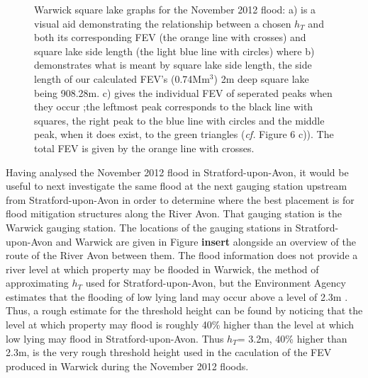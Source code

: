 \documentclass[11pt,a4paper]{article}
\begin{document}
\begin{figure}[ht!]
\centering
{}
\hfill
{}
\caption{Warwick square lake graphs for the November 2012 flood: a) is a visual aid demonstrating the relationship between a chosen $h_T$ and both its corresponding FEV (the orange line with crosses) and square lake side length (the light blue line with circles) where b) demonstrates what is meant by square lake side length, the side length of our calculated FEV's (0.74Mm$^3$) 2m deep square lake being 908.28m. c) gives the individual FEV of seperated peaks when they occur {;}the leftmost peak corresponds to the black line with squares, the right peak to the blue line with circles and the middle peak, when it does exist, to the green triangles (\textit{cf.} Figure 6 c)). The total FEV is given by the orange line with crosses.}
\end{figure}

Having analysed the November 2012 flood in Stratford-upon-Avon, it would be useful to next investigate the same flood at the next gauging station upstream from Stratford-upon-Avon in order to determine where the best placement is for flood mitigation structures along the River Avon. That gauging station is the Warwick gauging station. The locations of the gauging stations in Stratford-upon-Avon and Warwick are given in Figure \textbf{insert} alongside an overview of the route of the River Avon between them. The flood information does not provide a river level at which property may be flooded in Warwick, the method of approximating $h_T$ used for Stratford-upon-Avon, but the Environment Agency estimates that the flooding of low lying land may occur above a level of 2.3m \cite{EA}. Thus, a rough estimate for the threshold height can be found by noticing that the level at which property may flood is roughly 40\% higher than the level at which low lying may flood in Stratford-upon-Avon. Thus $h_T$= 3.2m, 40\% higher than 2.3m, is the very rough threshold height used in the caculation of the FEV produced in Warwick during the November 2012 floods.
\end{document}
